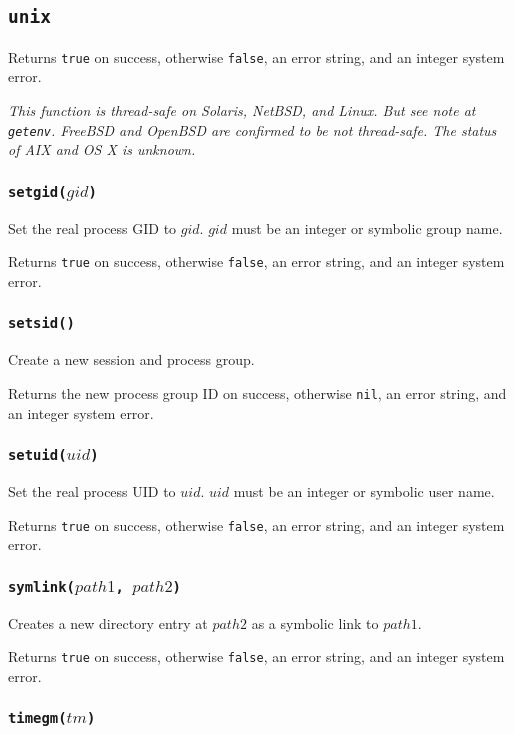 \documentclass[11pt, oneside]{memoir}
\newcommand*{\true}[0]{\texttt{true}\xspace}
\newcommand*{\false}[0]{\texttt{false}\xspace}
\newcommand*{\nil}[0]{\texttt{nil}\xspace}
\newcommand*{\fn}[1]{\texttt{#1}\xspace}
\newcounter{toccols}
\newenvironment{Module}[1]{
	\subsection{\texttt{#1}}
	\addtocontents{toc}{
		\protect\begin{multicols}{\value{toccols}}
	}
}{
	\addtocontents{toc}{\protect\end{multicols}}
}
\begin{document}
\begin{Module}{unix}
Returns \true on success, otherwise \false, an error string, and an integer system error.

\emph{This function is thread-safe on Solaris, NetBSD, and Linux. But see note at \fn{getenv}. FreeBSD and OpenBSD are confirmed to be not thread-safe. The status of AIX and OS X is unknown.}

\subsubsection[\fn{setgid}]{\fn{setgid($gid$)}}

Set the real process GID to $gid$. $gid$ must be an integer or symbolic group name.

Returns \true on success, otherwise \false, an error string, and an integer system error.

\subsubsection[\fn{setsid}]{\fn{setsid()}}

Create a new session and process group.

Returns the new process group ID on success, otherwise \nil, an error string, and an integer system error.

\subsubsection[\fn{setuid}]{\fn{setuid($uid$)}}

Set the real process UID to $uid$. $uid$ must be an integer or symbolic user name.

Returns \true on success, otherwise \false, an error string, and an integer system error.

\subsubsection[\fn{symlink}]{\fn{symlink($path1$, $path2$)}}

Creates a new directory entry at $path2$ as a symbolic link to $path1$.

Returns \true on success, otherwise \false, an error string, and an integer system error. 

\subsubsection[\fn{timegm}]{\fn{timegm($tm$)}}


\end{Module}
\end{document}
